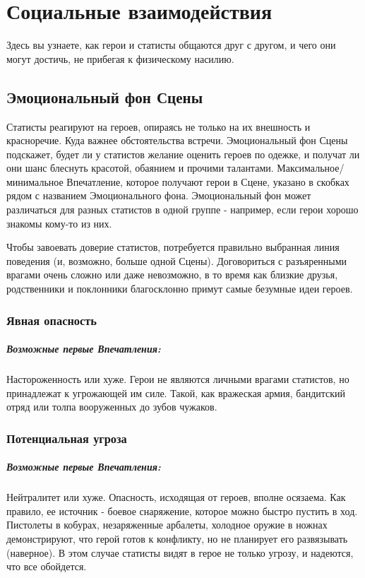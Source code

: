 \chapter{Социальные взаимодействия}
Здесь вы узнаете, как герои и статисты общаются друг с другом, и чего они могут достичь, не прибегая к физическому насилию.

\section{Эмоциональный фон Сцены}
Статисты реагируют на героев, опираясь не только на их внешность и красноречие. Куда важнее обстоятельства встречи. 
\newline Эмоциональный фон Сцены подскажет, будет ли у статистов желание оценить героев по одежке, и получат ли они шанс блеснуть красотой, обаянием и прочими талантами. Максимальное/минимальное Впечатление, которое получают герои в Сцене, указано в скобках рядом с названием Эмоционального фона. 
\newline Эмоциональный фон может различаться для разных статистов в одной группе - например, если герои хорошо знакомы кому-то из них.
\begin{tcolorbox}
  Чтобы завоевать доверие статистов, потребуется правильно выбранная линия поведения (и, возможно, больше одной Сцены). Договориться с разъяренными врагами очень сложно или даже невозможно, в то время как близкие друзья, родственники и поклонники благосклонно примут самые безумные идеи героев.
\end{tcolorbox}

\subsection{Явная опасность}
\paragraph{Возможные первые Впечатления:} Настороженность или хуже.
\newline Герои не являются личными врагами статистов, но принадлежат к угрожающей им силе. Такой, как вражеская армия, бандитский отряд или толпа вооруженных до зубов чужаков.

\subsection{Потенциальная угроза}
\paragraph{Возможные первые Впечатления:} Нейтралитет или хуже.
\newline Опасность, исходящая от героев, вполне осязаема. Как правило, ее источник - боевое снаряжение, которое можно быстро пустить в ход. Пистолеты в кобурах, незаряженные арбалеты, холодное оружие в ножнах демонстрируют, что герой готов к конфликту, но не планирует его развязывать (наверное). В этом случае статисты видят в герое не только угрозу, и надеются, что все обойдется.

